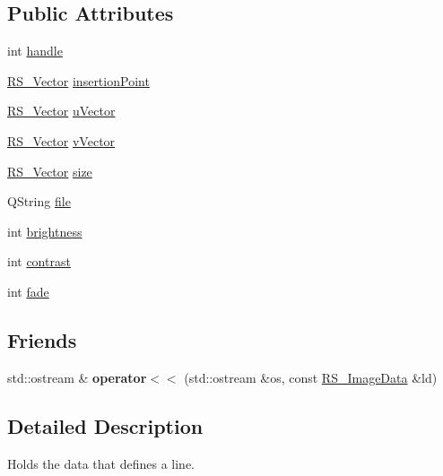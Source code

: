 \subsection*{Public Attributes}
\begin{DoxyCompactItemize}
\item 
int \hyperlink{classRS__ImageData_a28c803b859c0de2d6f34ba28f54883aa}{handle}
\item 
\hyperlink{classRS__Vector}{R\-S\-\_\-\-Vector} \hyperlink{classRS__ImageData_aaf6f77de66abe74d9a22323721a01b43}{insertion\-Point}
\item 
\hyperlink{classRS__Vector}{R\-S\-\_\-\-Vector} \hyperlink{classRS__ImageData_a1313726d8b7c341fdce24d3173504845}{u\-Vector}
\item 
\hyperlink{classRS__Vector}{R\-S\-\_\-\-Vector} \hyperlink{classRS__ImageData_addc13777db6fc456f6d60dd4deb170db}{v\-Vector}
\item 
\hyperlink{classRS__Vector}{R\-S\-\_\-\-Vector} \hyperlink{classRS__ImageData_a61be922fb59669f261444420eb95838e}{size}
\item 
Q\-String \hyperlink{classRS__ImageData_ab1e8cbf7bddf033267c25ce18b90222b}{file}
\item 
int \hyperlink{classRS__ImageData_a6aeb92c7c3cc0307bbab71df1aca35cd}{brightness}
\item 
int \hyperlink{classRS__ImageData_ac89ef574dc340a20662bbb8829eb0ba3}{contrast}
\item 
int \hyperlink{classRS__ImageData_afa168ba63f68678c24f14bcb10ef5b51}{fade}
\end{DoxyCompactItemize}
\subsection*{Friends}
\begin{DoxyCompactItemize}
\item 
\hypertarget{classRS__ImageData_a297e2ce8f66be6d96e59103c19816cfd}{std\-::ostream \& {\bfseries operator$<$$<$} (std\-::ostream \&os, const \hyperlink{classRS__ImageData}{R\-S\-\_\-\-Image\-Data} \&ld)}\label{classRS__ImageData_a297e2ce8f66be6d96e59103c19816cfd}

\end{DoxyCompactItemize}


\subsection{Detailed Description}
Holds the data that defines a line. 


